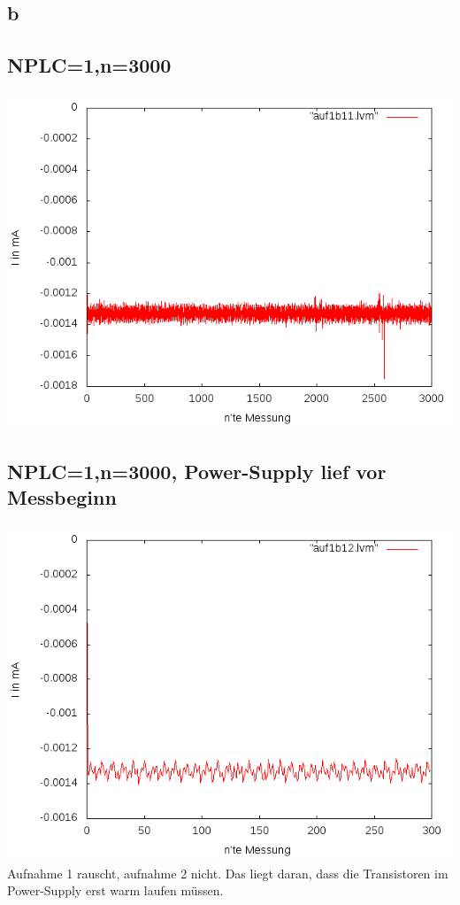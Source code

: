 \documentclass[compress,11pt]{beamer}
\begin{document}
\subsection{b}
\begin{frame}
\subsection{NPLC=1,n=3000}
\includegraphics[width=\textwidth]{images/auf1b11_lines.png}

\end{frame}
\begin{frame}
\subsection{NPLC=1,n=3000, Power-Supply lief vor Messbeginn}
\includegraphics[width=\textwidth]{images/auf1b12_lines.png}
Aufnahme 1 rauscht, aufnahme 2 nicht. Das liegt daran, dass die Transistoren im Power-Supply erst warm laufen müssen. 
\end{frame}
\end{document}

